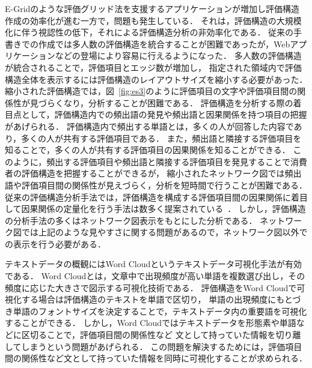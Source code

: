 \documentclass[syuuron]{kuee}
\begin{document}
	E-Gridのような評価グリッド法を支援するアプリケーションが増加し評価構造作成の効率化が進む一方で，問題も発生している．
	それは，評価構造の大規模化に伴う視認性の低下，それによる評価構造分析の非効率化である．
	従来の手書きでの作成では多人数の評価構造を統合することが困難であったが，Webアプリケーションなどの登場により容易に行えるようになった．
	多人数の評価構造が統合されることで，評価項目とエッジ数が増加し，
	指定された領域内で評価構造全体を表示するには評価構造のレイアウトサイズを縮小する必要があった． 
	縮小された評価構造では，図~\ref{fig:es3}のように評価項目の文字や評価項目間の関係性が見づらくなり，分析することが困難である．
	評価構造を分析する際の着目点として，評価構造内での頻出語の発見や頻出語と因果関係を持つ項目の把握があげられる．
	評価構造内で頻出する単語とは，多くの人が回答した内容であり，多くの人が共有する評価項目である．
	また，頻出語と隣接する評価項目を知ることで，多くの人が共有する評価項目の因果関係を知ることができる．
	このように，頻出する評価項目や頻出語と隣接する評価項目を発見することで消費者の評価構造を把握することができるが，
	縮小されたネットワーク図では頻出語や評価項目間の関係性が見えづらく，分析を短時間で行うことが困難である．
	従来の評価構造分析手法では，評価構造を構成する評価項目間の因果関係に着目して因果関係の定量化を行う手法は数多く提案されている~\cite{egm8}\cite{egm9}．
	しかし，評価構造の分析手法の多くはネットワーク図表示をもとにした分析である．
	ネットワーク図では上記のような見やすさに関する問題があるので，ネットワーク図以外での表示を行う必要がある．
	
	テキストデータの概観にはWord Cloudというテキストデータ可視化手法が有効である．
	Word Cloudとは，文章中で出現頻度が高い単語を複数選び出し，その頻度に応じた大きさで図示する可視化技術である\cite{wc1}．
	評価構造をWord Cloudで可視化する場合は評価構造のテキストを単語で区切り，
	単語の出現頻度にもとづき単語のフォントサイズを決定することで，テキストデータ内の重要語を可視化することができる．
	しかし，Word Cloudではテキストデータを形態素や単語などに区切ることで，評価項目間の関係性など
	文として持っていた情報を切り離してしまうという問題があげられる．
	この問題を解決するためには，評価項目間の関係性など文として持っていた情報を同時に可視化することが求められる．
	
\end{document}

